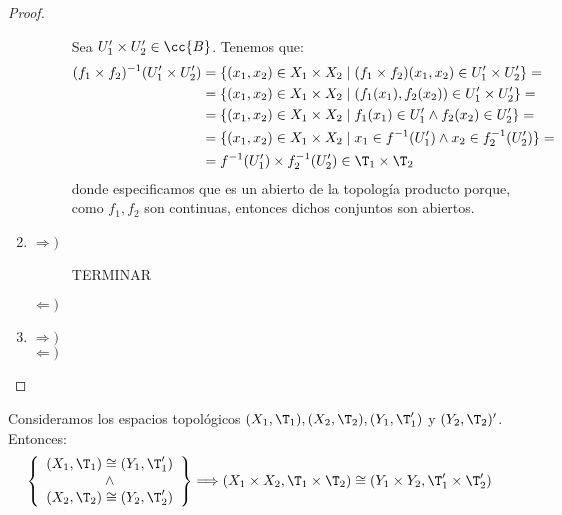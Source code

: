 \begin{proof}
\begin{enumerate}
\begin{description}
            Sea $U_1'\times U_2'\in \cc{B}$. Tenemos que:
            \begin{equation*}
                \begin{split}
                    (f_1\times f_2)^{-1}(U_1'\times U_2')
                    &= \{(x_1,x_2)\in X_1\times X_2\mid (f_1\times f_2)(x_1,x_2)\in U_1'\times U_2'\} =\\
                    &= \{(x_1,x_2)\in X_1\times X_2\mid (f_1(x_1), f_2(x_2))\in U_1'\times U_2'\} =\\
                    &= \{(x_1,x_2)\in X_1\times X_2\mid f_1(x_1) \in U_1' \land f_2(x_2) \in U_2'\} =\\
                    &= \{(x_1,x_2)\in X_1\times X_2\mid x_1 \in f^{-1}(U_1') \land x_2 \in f_2^{-1}(U_2')\} =\\
                    &= f^{-1}(U_1') \times f_2^{-1}(U_2') \in \T_1\times \T_2
                \end{split}
            \end{equation*}
            donde especificamos que es un abierto de la topología producto porque, como $f_1,f_2$ son continuas, entonces dichos conjuntos son abiertos.
        \end{description}
        \item \begin{description} %
            \item[$\Longrightarrow)$] TERMINAR 
            \item[$\Longleftarrow)$] 
        \end{description}
        \item \begin{description}
            \item[$\Longrightarrow)$]
            \item[$\Longleftarrow)$] 
        \end{description}
    \end{enumerate}
\end{proof}

\begin{coro}
    Consideramos los espacios topológicos $(X_1,\T_1), (X_2,\T_2), (Y_1,\T_1')$ y $(Y_2, \T_2)'$. Entonces:
    \begin{equation*}
        \left\{\begin{array}{c}
            (X_1, \T_1)\cong (Y_1,\T_1')\\
            \land\\
            (X_2, \T_2)\cong (Y_2,\T_2')\\
        \end{array}\right\} \Longrightarrow (X_1\times X_2, \T_1\times \T_2) \cong (Y_1\times Y_2, \T_1'\times \T_2')
    \end{equation*}
\end{coro}

